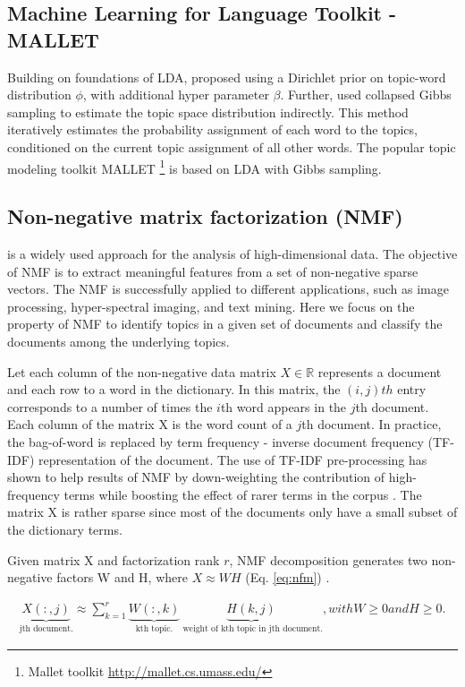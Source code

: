 \subsection{Machine Learning for Language Toolkit - MALLET}
Building on foundations of LDA, \cite{Griffiths} proposed using a Dirichlet prior on topic-word distribution $\phi$, with additional hyper parameter $\beta$. Further, \cite{Griffiths} used collapsed Gibbs sampling to estimate the topic space distribution indirectly. This method iteratively estimates the probability assignment of each word to the topics, conditioned on the current topic assignment of all other words. The popular topic modeling toolkit MALLET \footnote{Mallet toolkit \url{http://mallet.cs.umass.edu/}} is based on LDA with Gibbs sampling.


\subsection{Non-negative matrix factorization (NMF)} is a widely used approach for the analysis of high-dimensional data. The objective of NMF is to extract meaningful features from a set of non-negative sparse vectors. The NMF is successfully applied to different applications, such as image processing, hyper-spectral imaging,  and text mining.  Here we focus on the property of NMF to identify topics in a given set of documents and classify the documents among the underlying topics.

Let each column of the non-negative data matrix $X \in \mathbb{R}$ represents a document and each row to a word in the dictionary. In this matrix, the $(i, j)th$ entry corresponds to a number of times the $i$th word appears in the $j$th document. Each column of the matrix X is the word count of a $j$th document. In practice, the bag-of-word is replaced by term frequency - inverse document frequency (TF-IDF) representation of the document. The use of TF-IDF pre-processing has shown to help results of NMF by down-weighting the contribution of high-frequency terms while boosting the effect of rarer terms in the corpus \cite{Greene2016, Gillis2014}. The matrix X is rather sparse since most of the documents only have a small subset of the dictionary terms.

Given matrix X and factorization rank $r$, NMF decomposition generates two non-negative factors W and H, where $X \approx W H$ (Eq. \ref{eq:nfm}) \cite{Lee1999}. 

\begin{multline}\label{eq:nfm}
\underbrace{X(:,j)}_\text{jth document.} \approx \sum_{k=1}^{r} \underbrace{W(:,k)}_\text{kth topic.} \underbrace{H(k,j)}_\text{ weight of kth topic in jth document.} , 
with W \geq 0 and H \geq 0.
\end{multline}

